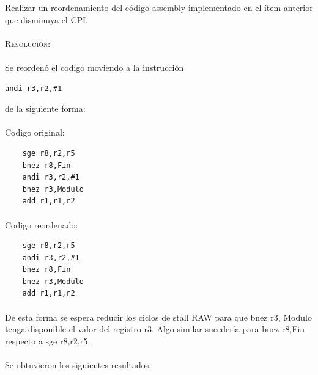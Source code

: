 \documentclass[a4paper,11pt]{article}
\begin{document}
\begin{enumerate}
Realizar un reordenamiento del c\'odigo assembly implementado en el \'item anterior que disminuya el CPI.

\paragraph{}
\underline{\textsc{Resoluci\'on:}}

\paragraph{} 
Se reorden\'o el codigo moviendo a la instrucci\'on 

\begin{verbatim}
andi r3,r2,#1 
\end{verbatim}


de la siguiente forma:

\paragraph{}
Codigo original:

\begin{center}
\begin{verbatim}
	sge r8,r2,r5
	bnez r8,Fin 
	andi r3,r2,#1 
	bnez r3,Modulo 
	add r1,r1,r2
\end{verbatim}
\end{center}

\paragraph{} 
Codigo reordenado:

\begin{center}
\begin{verbatim}
	sge r8,r2,r5 
	andi r3,r2,#1 
	bnez r8,Fin 	 
	bnez r3,Modulo 
	add r1,r1,r2
\end{verbatim}
\end{center}

\paragraph{}

De esta forma se espera reducir los ciclos de stall RAW para que bnez r3, Modulo tenga disponible el valor del registro r3. Algo similar suceder\'ia para bnez r8,Fin respecto a sge r8,r2,r5.

\paragraph{}
Se obtuvieron los siguientes resultados:


\end{enumerate}
\end{document}

